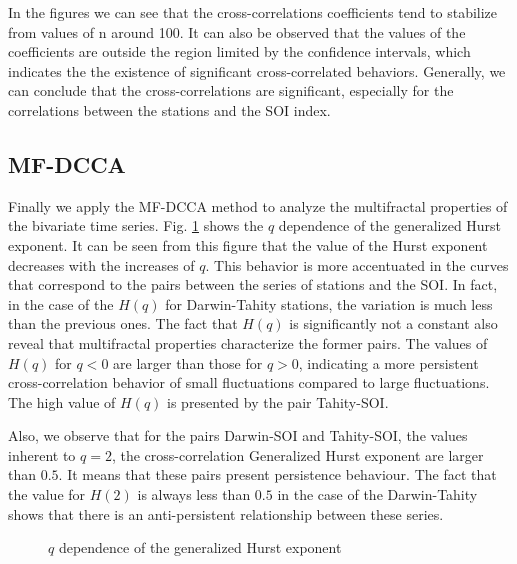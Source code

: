 \documentclass[onecolumn, preprint,aps,amsmath, amssymb, superscriptaddress]{revtex4}
\begin{document}
In the figures we can see that the cross-correlations coefficients tend to stabilize from values of n around 100. It can also be observed that the values of the coefficients are outside the region limited by the confidence intervals, which indicates the the existence of significant cross-correlated behaviors. Generally, we can conclude that the cross-correlations are significant, especially for the correlations between the stations and the SOI index.

\subsection{MF-DCCA}
\label{results_mfdcca}

Finally we apply the MF-DCCA method to analyze the multifractal properties of the bivariate time series. Fig. \ref{fig:mfdcca_H} shows the $q$ dependence of the generalized Hurst exponent. It can be seen from this figure that the value of the Hurst exponent decreases with the increases of $q$. This behavior is more accentuated in the curves that correspond to the pairs between the series of stations and the SOI. In fact, in the case of the $H(q)$ for Darwin-Tahity stations, the variation is much less than the previous ones. The fact that $H
(q)$ is significantly not a constant also reveal that multifractal properties characterize the former pairs. The values of $H(q)$ for $q < 0$ are larger than those for $q > 0$, indicating a more persistent cross-correlation behavior of
small fluctuations compared to large fluctuations. The high value of $H(q)$ is presented by the pair Tahity-SOI.

Also, we observe that for the pairs Darwin-SOI and Tahity-SOI, the values inherent to $q = 2$, the cross-correlation Generalized Hurst exponent are larger than $0.5$. It means that these pairs present persistence behaviour. The fact that the value for $H(2 )$ is always less than $0.5$ in the case of the Darwin-Tahity shows that there is an anti-persistent relationship between these series.

\begin{figure}
\caption{$q$ dependence of the generalized Hurst exponent}
\label{fig:mfdcca_H}
\end{figure}
\end{document}
